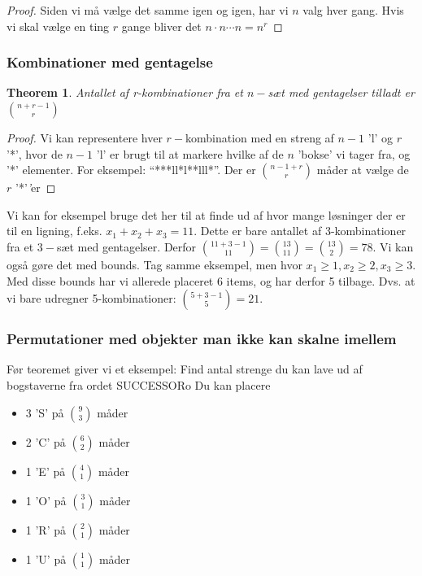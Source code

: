\documentclass[11pt]{article}
\newtheorem{theorem}{Theorem}
\theoremstyle{definition}
\theoremstyle{remark}
\begin{document}
\begin{proof}
Siden vi må vælge det samme igen og igen, har vi $n$  valg hver gang. Hvis vi skal vælge en ting $r$ gange bliver det $n \cdot n \cdots n = n^{r}$
\end{proof}

\subsubsection{Kombinationer med gentagelse}

\begin{theorem}
Antallet af r-kombinationer fra et $n-$sæt med gentagelser tilladt er $\binom{n+r-1}{r}$
\end{theorem}

\begin{proof}
  Vi kan representere hver $r-$kombination med en streng af $n-1$ 'l' og $r$ '*', hvor de $n-1$ 'l' er brugt til at markere hvilke af de $n$ 'bokse' vi tager fra, og '*' elementer. For eksempel: ``***ll*l**lll*''. Der er $\binom{n-1+r}{r}$ måder at vælge de $r$ '*'\emph{'}er
\end{proof}

Vi kan for eksempel bruge det her til at finde ud af hvor mange løsninger der er til en ligning, f.eks. $x_{1} + x_{2} + x_{3} = 11$. Dette er bare antallet af 3-kombinationer fra et $3-$sæt med gentagelser. Derfor $\binom{11+3-1}{11} = \binom{13}{11} = \binom{13}{2} = 78$. Vi kan også gøre det med bounds. Tag samme eksempel, men hvor $x_{1} \geq 1, x_{2} \geq 2, x_{3} \geq 3$. Med disse bounds har vi allerede placeret 6 items, og har derfor 5 tilbage. Dvs. at vi bare udregner 5-kombinationer: $\binom{5+3-1}{5} = 21$.


\subsubsection{Permutationer med objekter man ikke kan skalne imellem}

Før teoremet giver vi et eksempel:
Find antal strenge du kan lave ud af bogstaverne fra ordet SUCCESSORo
Du kan placere
\begin{itemize}
\item 3 'S' på $\binom{9}{3}$ måder
\item 2 'C' på $\binom{6}{2}$ måder
\item 1 'E' på $\binom{4}{1}$ måder
\item 1 'O' på $\binom{3}{1}$ måder
\item 1 'R' på $\binom{2}{1}$ måder
\item 1 'U' på $\binom{1}{1}$ måder
\end{itemize}
\end{document}
